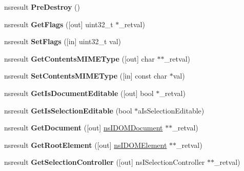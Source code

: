 \begin{DoxyCompactItemize}
nsresult {\bfseries Pre\+Destroy} ()
\item 
\mbox{\label{interfacens_i_editor_a02eb7159d862c83d8ea4bc038e410130}} 
nsresult {\bfseries Get\+Flags} (\mbox{[}out\mbox{]} uint32\+\_\+t $\ast$\+\_\+retval)
\item 
\mbox{\label{interfacens_i_editor_a8ed28409328489dfe640fddbbe1aa120}} 
nsresult {\bfseries Set\+Flags} (\mbox{[}in\mbox{]} uint32\+\_\+t val)
\item 
\mbox{\label{interfacens_i_editor_aa43e28a37344a5645bcd067e1b9f9a30}} 
nsresult {\bfseries Get\+Contents\+M\+I\+M\+E\+Type} (\mbox{[}out\mbox{]} char $\ast$$\ast$\+\_\+retval)
\item 
\mbox{\label{interfacens_i_editor_afc794fc6c34db4ef9a7fd1f4b67cf5b2}} 
nsresult {\bfseries Set\+Contents\+M\+I\+M\+E\+Type} (\mbox{[}in\mbox{]} const char $\ast$val)
\item 
\mbox{\label{interfacens_i_editor_a428fd9895ec9239660a55afd10b4c529}} 
nsresult {\bfseries Get\+Is\+Document\+Editable} (\mbox{[}out\mbox{]} bool $\ast$\+\_\+retval)
\item 
\mbox{\label{interfacens_i_editor_ac223bdfa70a0ae80424395ae37185652}} 
nsresult {\bfseries Get\+Is\+Selection\+Editable} (bool $\ast$a\+Is\+Selection\+Editable)
\item 
\mbox{\label{interfacens_i_editor_aed22e25a32a33074987dfd58b7a3d9d8}} 
nsresult {\bfseries Get\+Document} (\mbox{[}out\mbox{]} \hyperlink{interfacens_i_d_o_m_document}{ns\+I\+D\+O\+M\+Document} $\ast$$\ast$\+\_\+retval)
\item 
\mbox{\label{interfacens_i_editor_a5e847ef304147eb5960487f90ce33783}} 
nsresult {\bfseries Get\+Root\+Element} (\mbox{[}out\mbox{]} \hyperlink{interfacens_i_d_o_m_element}{ns\+I\+D\+O\+M\+Element} $\ast$$\ast$\+\_\+retval)
\item 
\mbox{\label{interfacens_i_editor_a8e16df4a18d746ca833fe2933bf83fc8}} 
nsresult {\bfseries Get\+Selection\+Controller} (\mbox{[}out\mbox{]} ns\+I\+Selection\+Controller $\ast$$\ast$\+\_\+retval)

\end{DoxyCompactItemize}
